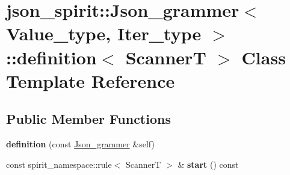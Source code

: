 \hypertarget{classjson__spirit_1_1_json__grammer_1_1definition}{}\section{json\+\_\+spirit\+::Json\+\_\+grammer$<$ Value\+\_\+type, Iter\+\_\+type $>$\+::definition$<$ ScannerT $>$ Class Template Reference}
\label{classjson__spirit_1_1_json__grammer_1_1definition}
\subsection*{Public Member Functions}
\begin{DoxyCompactItemize}
\item 
\mbox{\label{classjson__spirit_1_1_json__grammer_1_1definition_a00806fdc7bd694565d5106a61f62e3af}} 
{\bfseries definition} (const \mbox{\hyperlink{classjson__spirit_1_1_json__grammer}{Json\+\_\+grammer}} \&self)
\item 
\mbox{\label{classjson__spirit_1_1_json__grammer_1_1definition_abfd39514169eba6fc5eaef0d1a8aed95}} 
const spirit\+\_\+namespace\+::rule$<$ ScannerT $>$ \& {\bfseries start} () const
\end{DoxyCompactItemize}
